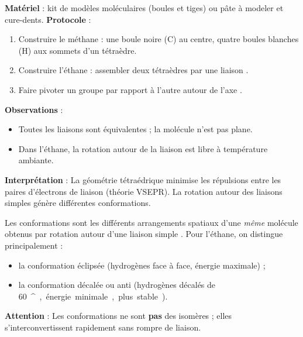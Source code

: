 \documentclass[11pt]{article}
\providecommand{\degree}{^{\circ}}
\newcommand{\cle}[1]{{\popxbold\color{popdark}#1}}
\begin{document}
\begin{experience}
\textbf{Matériel} : kit de modèles moléculaires (boules et tiges) ou pâte à modeler et cure-dents.
\textbf{Protocole} :
\begin{enumerate}
  \item Construire le méthane : une boule noire (C) au centre, quatre boules blanches (H) aux sommets d'un tétraèdre.
  \item Construire l'éthane  : assembler deux tétraèdres  par une liaison .
  \item Faire pivoter un groupe  par rapport à l'autre autour de l'axe .
\end{enumerate}
\textbf{Observations} :
\begin{itemize}
  \item Toutes les liaisons  sont équivalentes ; la molécule n'est pas plane.
  \item Dans l'éthane, la rotation autour de la liaison  est libre à température ambiante.
\end{itemize}
\textbf{Interprétation} : La géométrie tétraédrique minimise les répulsions entre les paires d'électrons de liaison (théorie VSEPR). La rotation autour des liaisons simples  génère différentes \cle{conformations}.
\end{experience}

\begin{definition}[Conformations]
Les \cle{conformations} sont les différents arrangements spatiaux d'une \emph{même} molécule obtenus par rotation autour d'une liaison simple . Pour l'éthane, on distingue principalement :
\begin{itemize}
  \item la conformation \cle{éclipsée} (hydrogènes face à face, énergie maximale) ;
  \item la conformation \cle{décalée} ou \cle{anti} (hydrogènes décalés de \SI{60}{\degree}, énergie minimale, plus stable).
\end{itemize}
\textbf{Attention} : Les conformations ne sont \textbf{pas} des isomères ; elles s'interconvertissent rapidement sans rompre de liaison.
\end{definition}
\end{document}
